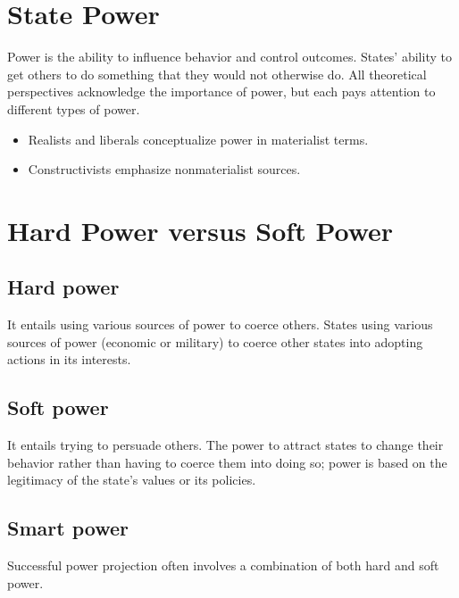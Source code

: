 \documentclass[
]{book}
\begin{document}
\hypertarget{state-power}{%
\section{State Power}\label{state-power}}

Power is the ability to influence behavior and control outcomes. States' ability to get others to do something that they would not otherwise do. All theoretical perspectives acknowledge the importance of power, but each pays attention to different types of power.

\begin{itemize}
\item
  Realists and liberals conceptualize power in materialist terms.
\item
  Constructivists emphasize nonmaterialist sources.
\end{itemize}

\hypertarget{hard-power-versus-soft-power}{%
\section{Hard Power versus Soft Power}\label{hard-power-versus-soft-power}}

\hypertarget{hard-power}{%
\subsection{Hard power}\label{hard-power}}

It entails using various sources of power to coerce others. States using various sources of power (economic or military) to coerce other states into adopting actions in its interests.

\hypertarget{soft-power}{%
\subsection{Soft power}\label{soft-power}}

It entails trying to persuade others. The power to attract states to change their behavior rather than having to coerce them into doing so; power is based on the legitimacy of the state's values or its policies.

\hypertarget{smart-power}{%
\subsection{Smart power}\label{smart-power}}

Successful power projection often involves a combination of both hard and soft power.
\end{document}
